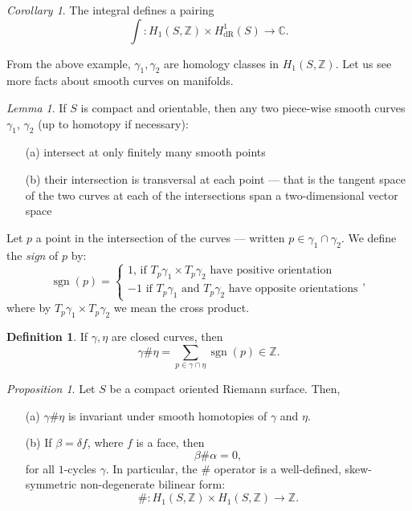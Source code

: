 \documentclass[a4paper]{report}
\theoremstyle{definition}
\newtheorem{definition}{Definition}
\theoremstyle{remark}
\theoremstyle{proposition}
\newtheorem{proposition}{Proposition}
\theoremstyle{conjecture}
\theoremstyle{lemma}
\newtheorem{lemma}{Lemma}
\theoremstyle{corollary}
\newtheorem{corollary}{Corollary}
\theoremstyle{exercise}
\theoremstyle{example}
\newcommand{\C}{\mathbb{C}}
\newcommand{\on}{\operatorname}
\begin{document}
\begin{corollary}
    The integral defines a pairing 
    $$\int : H_1(S,\mathbb{Z}) \times H^1_{\on{dR}}(S) \longrightarrow \C.$$
\end{corollary}

From the above example, $\gamma_1,\gamma_2$ are homology classes 
in $H_1(S,\mathbb{Z})$.
Let us see more facts about smooth curves on manifolds.

\begin{lemma}
    If $S$ is compact and orientable, then any two piece-wise smooth curves 
    $\gamma_1$, $\gamma_2$ (up to homotopy if necessary):
    \begin{itemize}
        \item[(a)] intersect at only finitely many smooth points
        \item[(b)] their intersection is transversal at each point --- 
            that is the tangent space of the two curves at each of the 
            intersections span a two-dimensional vector space
    \end{itemize}
    Let $p$ a point in the intersection of the curves --- written 
    $p \in \gamma_1\cap \gamma_2$. We define the 
    \emph{sign} of $p$ by:
    $$\on{sgn} (p) = \begin{cases}
        \text{$1$, if $T_p\gamma_1 \times T_p\gamma_2$ have positive orientation}\\
        \text{$-1$ if $T_p\gamma_1$ and $T_p\gamma_2$ have opposite orientations}
    \end{cases},$$
    where by $T_p\gamma_1 \times T_p\gamma_2$ we mean the cross product.
\end{lemma}

\begin{definition}
    If $\gamma,\eta$ are closed curves, then 
    $$\gamma \# \eta = \sum_{p \in \gamma \cap \eta} \on{sgn}(p)\in\mathbb{Z}.$$
\end{definition}

\begin{proposition}
    Let $S$ be a compact oriented Riemann surface. Then,
    \begin{itemize}
        \item[(a)] $\gamma \#\eta$ is invariant under smooth homotopies of 
            $\gamma$ and $\eta$.
        \item[(b)] If $\beta = \delta f$, where $f$ is a face, then 
            $$\beta\#\alpha = 0,$$ for all $1$-cycles $\gamma$. 
            In particular, the $\#$ operator is a well-defined, skew-symmetric
            non-degenerate bilinear form:
            $$\# : H_1(S,\mathbb{Z}) \times H_1(S,\mathbb{Z}) \longrightarrow \mathbb{Z}.$$
    \end{itemize}
\end{proposition}
\end{document}

